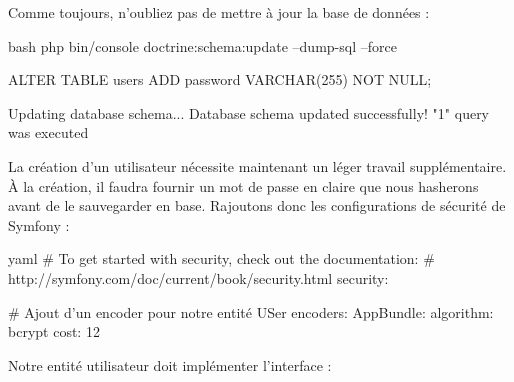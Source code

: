 \documentclass[big]{zmdocument}
\begin{document}
Comme toujours, n'oubliez pas de mettre à jour la base de données :



\begin{CodeBlock}{bash}
php bin/console doctrine:schema:update --dump-sql --force

ALTER TABLE users ADD password VARCHAR(255) NOT NULL;

Updating database schema...
Database schema updated successfully! "1" query was executed
\end{CodeBlock}



La création d'un utilisateur nécessite maintenant un léger travail supplémentaire. À la création, il faudra fournir un mot de passe en claire que nous hasherons avant de le sauvegarder en base.
Rajoutons donc les configurations de sécurité de Symfony :



\begin{CodeBlock}{yaml}
# To get started with security, check out the documentation:
# http://symfony.com/doc/current/book/security.html
security:

    # Ajout d'un encoder pour notre entité USer
    encoders:
        AppBundle\Entity\User:
            algorithm: bcrypt
            cost: 12
\end{CodeBlock}



Notre entité utilisateur doit implémenter l'interface  :



\end{document}
